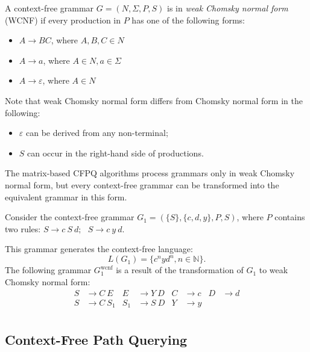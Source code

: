 \begin{definition} A context-free grammar $G = (N, \Sigma, P, S)$ is in \emph{weak Chomsky normal form} (WCNF) if every production in $P$ has one of the following forms:
    \begin{itemize}
        \item $A \rightarrow BC$, where $A, B, C \in N$
        \item  $A \rightarrow a$, where $A \in N, a \in \Sigma$
        \item $A \rightarrow \varepsilon$, where $A \in N$
    \end{itemize}
\end{definition}

Note that weak Chomsky normal form differs from Chomsky normal form in the following:
\begin{itemize}
    \item $\varepsilon$ can be derived from any non-terminal;
    \item $S$ can occur in the right-hand side of productions.
\end{itemize}

The matrix-based CFPQ algorithms process grammars only in weak Chomsky normal form, but every context-free grammar can be transformed into the equivalent grammar in this form.

Consider the context-free grammar $G_1=(\{S\},\{c, d, y\}, P, S)$, where $P$ contains two rules:
$S \rightarrow c \ S \ d; \ \ \ 
S \rightarrow c \ y \ d
$.

This grammar generates the context-free language: $$L(G_1) = \{c^nyd^n, n \in \mathbb{N}\}.$$
The following grammar $G_1^{\text{wcnf}}$ is a result of the transformation of $G_1$ to weak Chomsky normal form:
\begin{align*}
S& \to C \ E   & E& \to Y \ D   & C& \to c &D& \to d   \\
S& \to C \ S_1 & S_1& \to S \ D & Y& \to y &&  \\
\end{align*}


\subsection{Context-Free Path Querying}

